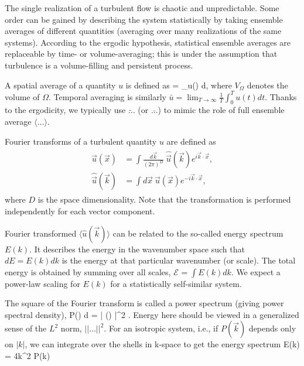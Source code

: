 \documentclass[usenatbib,twocolumn]{aastex63}
\newcommand{\ene}[2]{\mathcal{E}_{#1}^{#2}} %
\begin{document}
The single realization of a turbulent flow is chaotic and unpredictable.
Some order can be gained by describing the system statistically by taking ensemble averages of different quantities (averaging over many realizations of the same systems).
According to the ergodic hypothesis, statistical ensemble averages are replaceable by time- or volume-averaging;
this is under the assumption that turbulence is a volume-filling and persistent process.

A spatial average of a quantity $u$ is defined as
\be
{} =  \int_\Omega u() d,
\ee
where $V_\Omega$ denotes the volume of $\Omega$.
Temporal averaging is similarly $\bar{u} = \lim_{T\rightarrow\infty} \frac{1}{T} \int_0^T u(t) dt$.
Thanks to the ergodicity, we typically use $\tilde{\ldots}$ (or $\bar{\ldots}$) to mimic the role of full ensemble average $\langle \ldots \rangle$.

Fourier transforms of a turbulent quantity $u$ are defined as
\begin{align}\begin{split}
            \vec{u}(\vec{x}) &= \int \frac{ d\vec{k} }{(2\pi)^D} ~ \hat{\vec{u}}(\vec{k}) e^{i \vec{k} \cdot \vec{x} }, \\
    \hat{ \vec{u}} (\vec{k}) &= \int d\vec{x}~ \vec{u}(\vec{x}) e^{-i \vec{k} \cdot \vec{x} },
\end{split}\end{align}
where $D$ is the space dimensionality.
Note that the transformation is performed independently for each vector component.

Fourier transformed $\langle \hat{u}(\vec{k}) \rangle$ can be related to the so-called energy spectrum $E(k)$.
It describes the energy in the wavenumber space such that $dE = E(k) dk$ is the energy at that particular wavenumber (or scale).
The total energy is obtained by summing over all scales, $\ene{}{} = \int E(k) dk$.
We expect a power-law scaling for $E(k)$ for a statistically self-similar system.

The square of the Fourier transform is called a power spectrum (giving power spectral density),
\be
P() d = \langle | () |^2 \rangle.
\ee
Energy here should be viewed in a generalized sense of the $L^2$ norm, $||\ldots||^2$.
For an isotropic system, i.e., if $P(\vec{k})$ depends only on $|k|$, we can integrate over the shells in k-space to get the energy spectrum
\be
E(k) = 4\pi k^2 P(k)
\ee
\end{document}

